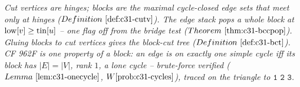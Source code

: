 \begin{recallbox}
\emph{Cut vertices are hinges; blocks are the maximal cycle-closed edge sets that meet
only at hinges (\(\defref{c31-cutv}\)).  The edge stack pops a whole block at
\(\mathrm{low}[v]\ge\operatorname{tin}[u]\) -- one flag off from the bridge test (\(\thmref{c31-bccpop}\)).
Gluing blocks to cut vertices gives the block-cut tree (\(\defref{c31-bct}\)).  CF 962F is
one property of a block: an edge is on exactly one simple cycle iff its block has
\(|E|=|V|\), rank \(1\), a lone cycle -- brute-force verified (\(\lemref{c31-onecycle}\),
\(\probref{c31-cycles}\)), traced on the triangle to \(\texttt{1 2 3}\).}
\end{recallbox}
